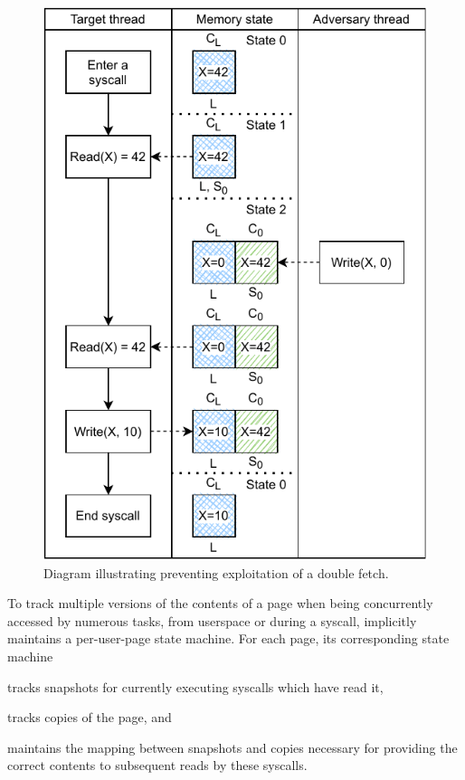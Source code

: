 \documentclass[letterpaper,twocolumn,10pt, anonymous]{article}
\begin{document}
\begin{figure}[h]
  \centering
  \includegraphics[width=\linewidth]{img/doublefetch_tiktok.pdf}
  \caption{Diagram illustrating \tiktok preventing exploitation of a double fetch.}
  \label{fig:doublefetch_tiktok}
\end{figure}

To track multiple versions of the contents of a page when being concurrently 
accessed by numerous tasks, from userspace or during a syscall,
\tiktok implicitly maintains a per-user-page state machine.
For each page, its corresponding state machine 
\begin{inparaenum}
  \item tracks snapshots for currently executing syscalls which have read it, 
  \item tracks copies of the page, and 
  \item maintains the mapping between snapshots and copies necessary for providing 
  the correct contents to subsequent reads by these syscalls.
\end{inparaenum}
\end{document}
